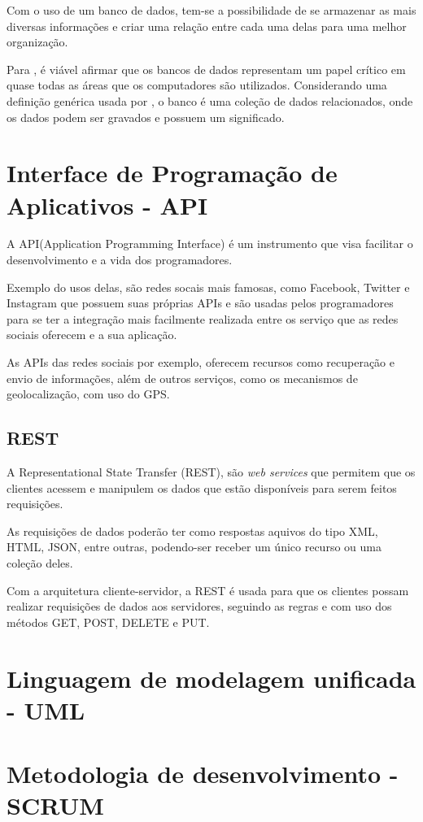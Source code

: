 Com o uso de um banco de dados, tem-se a possibilidade de se armazenar as mais diversas informações e criar uma relação entre cada uma delas para uma melhor organização.

Para \cite{elmasri2005}, é viável afirmar que os bancos de dados representam um papel crítico em quase todas as áreas que os computadores são utilizados. Considerando uma definição genérica usada por \cite{elmasri2005}, o banco é uma coleção de dados relacionados, onde os dados podem ser gravados e possuem um significado.

\section{Interface de Programação de Aplicativos - API}
A API(Application Programming Interface) é um instrumento que visa facilitar o desenvolvimento e a vida dos programadores. 

Exemplo do usos delas, são redes socais mais famosas, como Facebook, Twitter e Instagram que possuem suas próprias APIs e são usadas pelos programadores para se ter a integração mais facilmente realizada entre os serviço que as redes sociais oferecem e a sua aplicação.

As APIs das redes sociais por exemplo, oferecem recursos como recuperação e envio de informações, além de outros serviços, como os mecanismos de geolocalização, com uso do GPS.

\subsection{REST}
A Representational State Transfer (REST), são \textit{web services} que permitem que os clientes acessem e manipulem os dados que estão disponíveis para serem feitos requisições. 

As requisições de dados poderão ter como respostas aquivos do tipo XML, HTML, JSON, entre outras, podendo-ser receber um único recurso ou 
uma coleção deles.

Com a arquitetura cliente-servidor, a REST é usada para que os clientes possam realizar requisições de dados aos servidores, seguindo as regras e com uso dos métodos GET, POST, DELETE e PUT.  

\section{Linguagem de modelagem unificada - UML}

\section{Metodologia de desenvolvimento - SCRUM}

